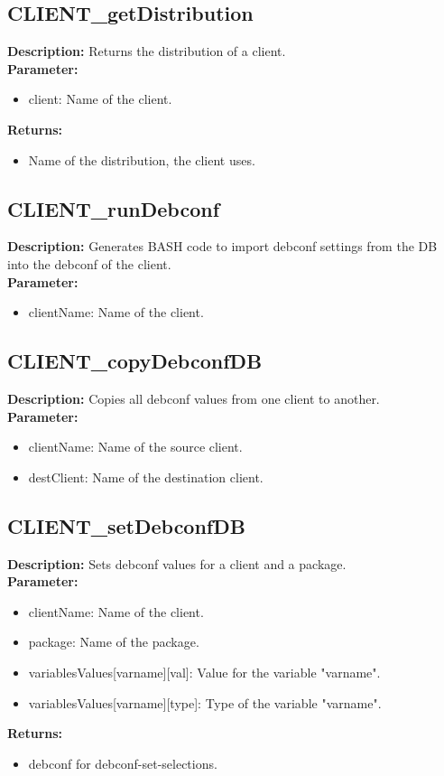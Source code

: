 \subsection{CLIENT\_getDistribution}
\textbf{Description:} Returns the distribution of a client.\\
\textbf{Parameter:}
\begin{itemize}
\item client: Name of the client.
\end{itemize}
\textbf{Returns:}
\begin{itemize}
\item Name of the distribution, the client uses.
\end{itemize}

\subsection{CLIENT\_runDebconf}
\textbf{Description:} Generates BASH code to import debconf settings from the DB into the debconf of the client.\\
\textbf{Parameter:}
\begin{itemize}
\item clientName: Name of the client.
\end{itemize}

\subsection{CLIENT\_copyDebconfDB}
\textbf{Description:} Copies all debconf values from one client to another.\\
\textbf{Parameter:}
\begin{itemize}
\item clientName: Name of the source client.
\item destClient: Name of the destination client.
\end{itemize}

\subsection{CLIENT\_setDebconfDB}
\textbf{Description:} Sets debconf values for a client and a package.\\
\textbf{Parameter:}
\begin{itemize}
\item clientName: Name of the client.
\item package: Name of the package.
\item variablesValues[varname][val]: Value for the variable "varname".
\item variablesValues[varname][type]: Type of the variable "varname".
\end{itemize}
\textbf{Returns:}
\begin{itemize}
\item debconf for debconf-set-selections.
\end{itemize}

